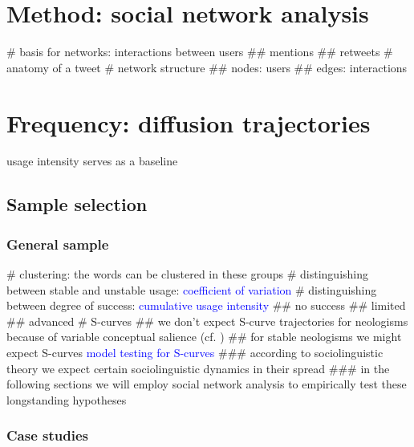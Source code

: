\documentclass[
  a4paper,
  ]{scrartcl}
\newcommand{\mtrc}[1]{\textcolor{blue}{#1}}
\begin{document}
\section{Method: social network analysis}

  \begin{easylist}[itemize]
    # basis for networks: interactions between users
      ## mentions
      ## retweets
    # anatomy of a tweet
    # network structure
      ## nodes: users
      ## edges: interactions
  \end{easylist}

\section{Frequency: diffusion trajectories}

  usage intensity serves as a baseline

  \subsection{Sample selection}

    \subsubsection{General sample}

      \begin{easylist}[itemize]
        # clustering: the words can be clustered in these groups \parencite{Kerremans2015}
        # distinguishing between stable and unstable usage: \mtrc{coefficient of variation}
        # distinguishing between degree of success: \mtrc{cumulative usage intensity}
          ## no success
          ## limited
          ## advanced
      # S-curves
        ## we don't expect S-curve trajectories for  neologisms because of variable conceptual salience (cf. \cite{Nini2017})
        ## for stable neologisms we might expect S-curves \mtrc{model testing for S-curves}
          ### according to sociolinguistic theory we expect certain sociolinguistic dynamics in their spread
          ### in the following sections we will employ social network analysis to empirically test these longstanding hypotheses
      \end{easylist}

    \subsubsection{Case studies}
\end{document}

